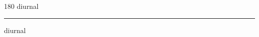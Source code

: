 
\begin{frame}
\begin{center}
\begin{turn}{180}
{\fontsize{2.5cm}{1em}\selectfont diurnal}
\end{turn}
\vspace{1em}\par  
\hrule
\vspace{1em}\par  
{\fontsize{2.5cm}{1em}\selectfont diurnal}
\end{center}
\end{frame}
